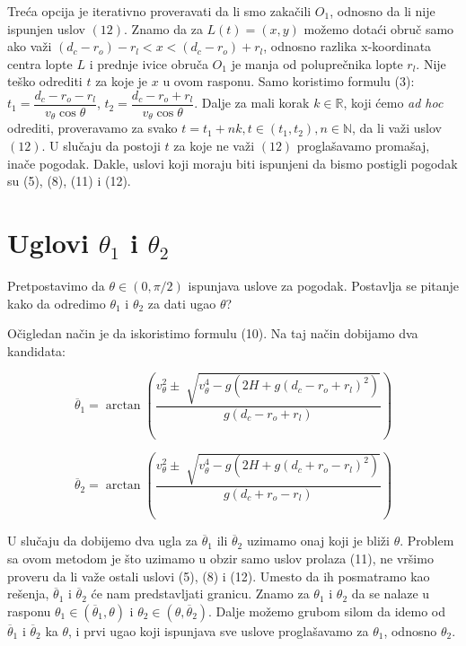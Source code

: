 \documentclass[a4paper, 12pt]{article}
\begin{document}
Treća opcija je iterativno proveravati da li smo zakačili $O_1$, odnosno da li nije ispunjen uslov $(12)$. Znamo da za $L(t) = (x,y)$ možemo dotaći obruč samo ako važi $(d_c - r_o) - r_l < x < (d_c - r_o) + r_l $, odnosno razlika x-koordinata centra lopte $L$ i prednje ivice obruča $O_1$ je manja od poluprečnika lopte $r_l$. Nije teško odrediti $t$ za koje je $x$ u ovom rasponu. Samo koristimo formulu (3): $t_1 = \dfrac{d_c - r_o - r_l}{v_\theta \cos \theta}$, $t_2 = \dfrac{d_c - r_o + r_l}{v_\theta \cos \theta}$. Dalje za mali korak $k \in  \mathbb{R}$, koji ćemo \textit{ad hoc} odrediti, proveravamo za svako $t = t_1+nk, t \in (t_1,t_2), n \in  \mathbb{N}$, da li važi uslov $(12)$. U slučaju da postoji $t$ za koje ne važi $(12)$ proglašavamo promašaj, inače pogodak.
Dakle, uslovi koji moraju biti ispunjeni da bismo postigli pogodak su (5), (8), (11) i (12).






\section{Uglovi $\theta_1$ i $\theta_2$}
Pretpostavimo da $\theta \in (0,\pi/2)$ ispunjava uslove za pogodak. Postavlja se pitanje kako da odredimo $\theta_1$ i $\theta_2$ za dati ugao $\theta$?

Očigledan način je da iskoristimo formulu (10). Na taj način dobijamo dva kandidata:

\[ \overline\theta_1 = \arctan (\dfrac{v_\theta^2 \pm \sqrt[]{v_\theta^4 - g(2 H + g (d_c - r_o + r_l)^2)}}{g (d_c - r_o + r_l)}) \]

\[ \overline\theta_2 = \arctan (\dfrac{v_\theta^2 \pm \sqrt[]{v_\theta^4 - g(2 H + g (d_c + r_o - r_l)^2)}}{g (d_c + r_o - r_l)}) \]

U slučaju da dobijemo dva ugla za $\overline\theta_1$ ili $\overline\theta_2$ uzimamo onaj koji je bliži $\theta$.
Problem sa ovom metodom je što uzimamo u obzir samo uslov prolaza (11), ne vršimo proveru da li važe ostali uslovi (5), (8) i (12). Umesto da ih posmatramo kao rešenja, $\overline\theta_1$ i $\overline\theta_2$ će nam predstavljati granicu. Znamo za $\theta_1$ i $\theta_2$ da se nalaze u rasponu $\theta_1 \in (\overline\theta_1, \theta)$ i $\theta_2 \in (\theta, \overline\theta_2)$. Dalje možemo grubom silom da idemo od $\overline\theta_1$ i $\overline\theta_2$ ka $\theta$, i prvi ugao koji ispunjava sve uslove proglašavamo za $\theta_1$, odnosno $\theta_2$.
\end{document}
